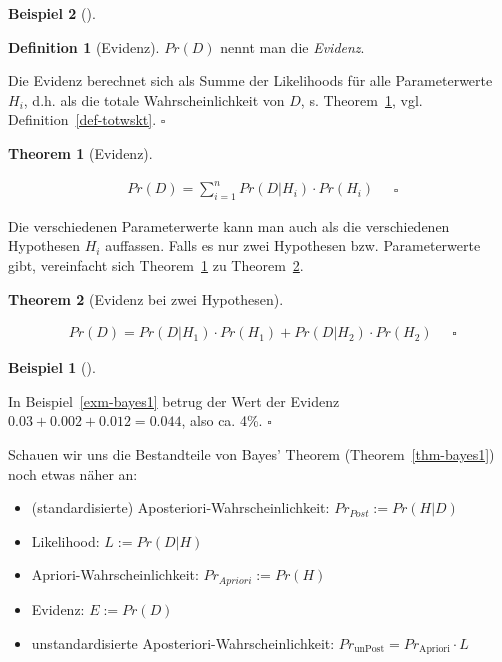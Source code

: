 \documentclass[
  ngerman,
  letterpaper,
  twoside,
  open=any]{scrbook}
\providecommand{\tightlist}{%
  \setlength{\itemsep}{0pt}\setlength{\parskip}{0pt}}\usepackage{longtable,booktabs,array}
\theoremstyle{definition}
\newtheorem{example}{Beispiel}[chapter]
\theoremstyle{plain}
\newtheorem{theorem}{Theorem}[chapter]
\theoremstyle{definition}
\theoremstyle{definition}
\newtheorem{definition}{Definition}[chapter]
\theoremstyle{remark}
\begin{document}
\begin{example}[]
\begin{definition}[Evidenz]
\(Pr(D)\) nennt man die \emph{Evidenz}.

Die Evidenz berechnet sich als Summe der Likelihoods für alle
Parameterwerte \(H_i\), d.h. als die totale Wahrscheinlichkeit von
\(D\), s. Theorem~\ref{thm-evidenz}, vgl. Definition~\ref{def-totwskt}.
\(\square\)

\end{definition}

\begin{theorem}[Evidenz]\protect\hypertarget{thm-evidenz}{}\label{thm-evidenz}

\[
\begin{aligned}
Pr(D) = \sum_{i=1}^n Pr(D|H_i) \cdot Pr(H_i)
\end{aligned}\quad \square
\]

\end{theorem}

Die verschiedenen Parameterwerte kann man auch als die verschiedenen
Hypothesen \(H_i\) auffassen. Falls es nur zwei Hypothesen bzw.
Parameterwerte gibt, vereinfacht sich Theorem~\ref{thm-evidenz} zu
Theorem~\ref{thm-evidenz2}.

\begin{theorem}[Evidenz bei zwei
Hypothesen]\protect\hypertarget{thm-evidenz2}{}\label{thm-evidenz2}

\[
\begin{aligned}
Pr(D) = Pr(D|H_1) \cdot Pr(H_1) + Pr(D|H_2) \cdot Pr(H_2)
\end{aligned}\quad \square
\]

\end{theorem}

\begin{example}[]\protect\hypertarget{exm-evidenz1}{}\label{exm-evidenz1}

In Beispiel~\ref{exm-bayes1} betrug der Wert der Evidenz
\(0.03 + 0.002 + 0.012 = 0.044\), also ca. 4\%. \(\square\)

\end{example}

Schauen wir uns die Bestandteile von Bayes' Theorem
(Theorem~\ref{thm-bayes1}) noch etwas näher an:

\begin{itemize}
\tightlist
\item
  (standardisierte) Aposteriori-Wahrscheinlichkeit:
  \(Pr_{Post} := Pr(H|D)\)
\item
  Likelihood: \(L := Pr(D|H)\)
\item
  Apriori-Wahrscheinlichkeit: \(Pr_{Apriori} := Pr(H)\)
\item
  Evidenz: \(E := Pr(D)\)
\item
  unstandardisierte Aposteriori-Wahrscheinlichkeit:
  \(Pr_{\text{unPost}} = Pr_{\text{Apriori}} \cdot L\)
\end{itemize}


\end{example}
\end{document}
